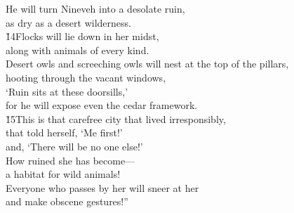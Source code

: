 \begin{poetry}
\poemll    He will turn Nineveh into a desolate ruin, \\
\poemlll       as dry as a desert wilderness. \\
\poeml \v{14}Flocks will lie down in her midst, \\
\poemll    along with animals of every kind. \\
\poeml Desert owls and screeching owls will nest at the top of the pillars, \\
\poemll    hooting through the vacant windows, \\
\poemlll       `Ruin sits at these doorsills,' \\
\poeml for he will expose even the cedar framework. \\
\poeml \v{15}This is that carefree city that lived irresponsibly, \\
\poemll    that told herself, `Me first!' \\
\poemlll       and, `There will be no one else!' \\
\poeml How ruined she has become--- \\
\poemll    a habitat for wild animals! \\
\poeml Everyone who passes by her will sneer at her \\
\poemll    and make obscene gestures!''
\end{poetry}

